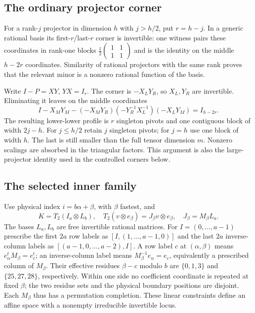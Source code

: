 \subsection{The ordinary projector corner}
For a rank-$j$ projector in dimension $h$ with $j>h/2$, put $r=h-j$.
In a generic rational basis its first-$r$/last-$r$ corner is invertible:
one witness pairs these coordinates in rank-one blocks
$\frac12\left(\begin{smallmatrix}1&1\\1&1\end{smallmatrix}\right)$
and is the identity on the middle $h-2r$ coordinates. Similarity of
rational projectors with the same rank proves that the relevant minor
is a nonzero rational function of the basis.

Write $I-P=XY$, $YX=I_r$. The corner is $-X_LY_R$, so $X_L,Y_R$ are
invertible. Eliminating it leaves on the middle coordinates
\[
 I-X_MY_M-(-X_MY_R)(-Y_R^{-1}X_L^{-1})(-X_LY_M)=I_{h-2r}.
\]
The resulting lower-lower profile is $r$ singleton pivots and one
contiguous block of width $2j-h$. For $j\le h/2$ retain $j$ singleton
pivots; for $j=h$ use one block of width $h$. The last is still smaller
than the full tensor dimension $m$. Nonzero scalings are absorbed in
the triangular factors. This argument is also the large-projector
identity used in the controlled corners below.

\subsection{The selected inner family}
Use physical index $i=b\alpha+\beta$, with $\beta$ fastest, and
\[
 K=T_2(I_a\otimes L_b),\quad
 T_2(v\otimes e_\beta)=J_\beta v\otimes e_\beta,\quad
 J_\beta=M_\beta L_a.
\]
The bases $L_a,L_b$ are free invertible rational matrices. For
$I=(0,\ldots,a-1)$ prescribe the first $2a$ row labels as
$[I,(1,\ldots,a-1,0)]$ and the last $2a$ inverse-column labels as
$[(a-1,0,\ldots,a-2),I]$.
A row label $c$ at $(\alpha,\beta)$ means
$e_\alpha^tM_\beta=e_c^t$; an inverse-column label means
$M_\beta^{-1}e_\alpha=e_c$, equivalently a prescribed column of $M_\beta$.
Their effective residues $\beta-c$ modulo $b$ are $\{0,1,3\}$ and
$\{25,27,28\}$, respectively. Within one side no coefficient coordinate
is repeated at fixed $\beta$; the two residue sets and the physical
boundary positions are disjoint. Each $M_\beta$ thus has a permutation
completion. These linear constraints define an affine space with a
nonempty irreducible invertible locus.

